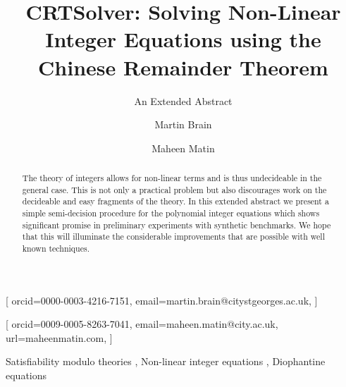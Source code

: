 \documentclass[
]{ceurart}
\begin{document}


\title{CRTSolver: Solving Non-Linear Integer Equations using the Chinese Remainder Theorem}
\subtitle{An Extended Abstract}


\author[1]{Martin Brain}[%
orcid=0000-0003-4216-7151,
email=martin.brain@citystgeorges.ac.uk,
]
\address[1]{City St. George's, University of London,
  Northampton Square, London, EC1V 0HB, United Kingdom}

\author[1]{Maheen Matin}[%
orcid=0009-0005-8263-7041,
email=maheen.matin@city.ac.uk,
url=maheenmatin.com,
]


\begin{abstract}
 The theory of integers allows for non-linear terms and is thus
 undecideable in the general case.
 This is not only a practical problem but also discourages work on
 the decideable and easy fragments of the theory.
 In this extended abstract we present a simple semi-decision procedure
 for the polynomial integer equations which shows significant promise
 in preliminary experiments with synthetic benchmarks.
 We hope that this will illuminate the considerable improvements that
 are possible with well known techniques.
\end{abstract}

\begin{keywords}
  Satisfiability modulo theories \sep
  Non-linear integer equations \sep
  Diophantine equations
\end{keywords}

\maketitle



\end{document}
